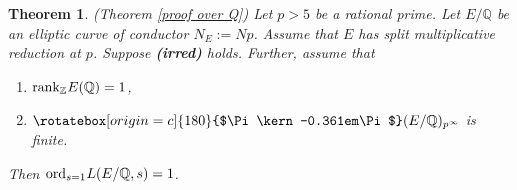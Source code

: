 \documentclass[reqno,10pt]{amsart}
\newcommand{\q}{\mathbb{Q}}
\newcommand{\z}{\mathbb{Z}}
\newcommand{\Varpi}{\rotatebox[origin=c]{180}{$\Pi\kern-0.361em\Pi$}}
\theoremstyle{plain}
\newtheorem{thm}{Theorem}[section]
\theoremstyle{definition}
\begin{document}
\begin{thm} \label{p-converse over Q} (Theorem \ref{proof over Q})
    Let $p > 5$ be a rational prime. Let $E/\q$ be an elliptic curve of conductor $N_E := Np$. Assume that $E$ has split multiplicative reduction at $p$. Suppose \textbf{(irred)} holds. Further, assume that
    \begin{enumerate}
        \item $\mathrm{rank}_\z \hspace{0.1mm} E(\q) = 1$,
        \item $\Varpi(E/\q)_{p^\infty}$ is finite.
    \end{enumerate}
    Then $\mathrm{ord}_{s=1} \hspace{0.1mm} L(E/\q,s) = 1$.
\end{thm}



\end{document}
